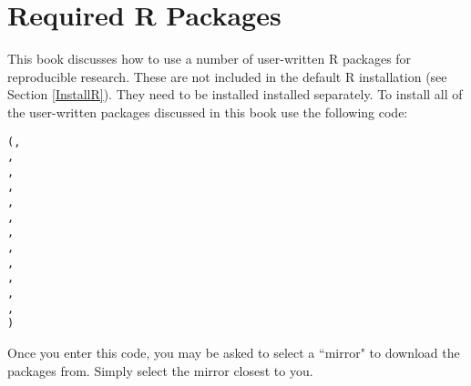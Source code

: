 


\chapter*{Required R Packages} \label{ReqPackages}

This book discusses how to use a number of user-written R packages for reproducible research. These are not included in the default R installation (see Section \ref{InstallR}). They need to be installed installed separately. To install all of the user-written packages discussed in this book use the following code:

\begin{knitrout}
\color{fgcolor}\begin{kframe}
\begin{alltt}
(, 
                , 
                ,
                , 
                , 
                , 
                , 
                , 
                ,
                ,
                ,                     
                , 
                )
\end{alltt}
\end{kframe}
\end{knitrout}


Once you enter this code, you may be asked to select a ``mirror" to download the packages from. Simply select the mirror closest to you.



